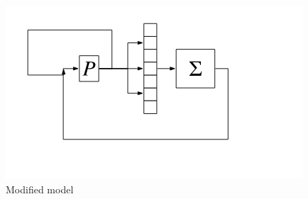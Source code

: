 \documentclass{article}
\begin{document}
  \begin{figure}[h!]
    \centering
    \includegraphics[scale=0.8]{./Data/modifiedmodel.png}
    \caption{Modified model}
  \end{figure} 
\end{document}
